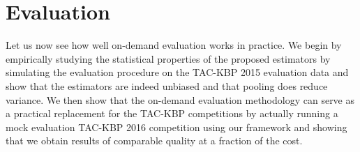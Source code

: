 \section{Evaluation}
\label{sec:evaluation}

Let us now see how well on-demand evaluation works in practice.
We begin by empirically studying the statistical properties of the proposed estimators by simulating the evaluation procedure on the TAC-KBP 2015 evaluation data and show that the estimators are indeed unbiased and that pooling does reduce variance.
We then show that the on-demand evaluation methodology can serve as a practical replacement for the TAC-KBP competitions by actually running a mock evaluation TAC-KBP 2016 competition using our framework and showing that we obtain results of comparable quality at a fraction of the cost.

